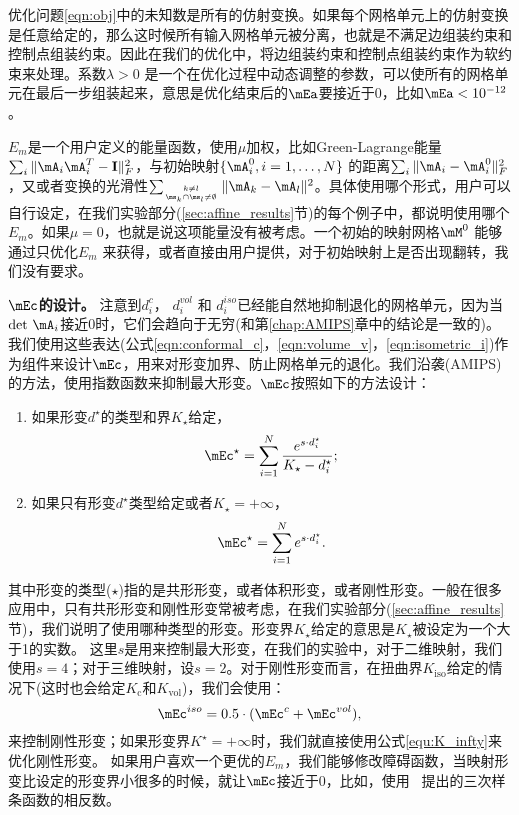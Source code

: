 优化问题\ref{eqn:obj}中的未知数是所有的仿射变换。如果每个网格单元上的仿射变换是任意给定的，那么这时候所有输入网格单元被分离，也就是不满足边组装约束和控制点组装约束。因此在我们的优化中，将边组装约束和控制点组装约束作为软约束来处理。系数$\lambda > 0$ 是一个在优化过程中动态调整的参数，可以使所有的网格单元在最后一步组装起来，意思是优化结束后的$\mEa$要接近于0，比如$\mEa<10^{-12}$。

$E_m$是一个用户定义的能量函数，使用$\mu$加权，比如Green-Lagrange能量$\sum_i \|\mA_i \mA_i^T - \mathbf{I}\|_F^2$，与初始映射$\{\mA_i^0,i=1,\ldots,N\}$ 的距离$\sum_i \|\mA_i - \mA_i^0\|_F^2$，又或者变换的光滑性$\sum_{k \neq l \atop \ms_k \cap \ms_l \neq \emptyset} \| \mA_k - \mA_l\|^2$。具体使用哪个形式，用户可以自行设定，在我们实验部分(\ref{sec:affine_results}节)的每个例子中，都说明使用哪个$E_m$。如果$\mu=0$，也就是说这项能量没有被考虑。一个初始的映射网格$\mM^0$ 能够通过只优化$E_m$ 来获得，或者直接由用户提供，对于初始映射上是否出现翻转，我们没有要求。

\textbf{$\mEc$的设计。} 注意到$d^c_i$， $d^{vol}_i$ 和 $d^{iso}_i$已经能自然地抑制退化的网格单元，因为当$\det \,\mA_i$接近0时，它们会趋向于无穷(和第\ref{chap:AMIPS}章中的结论是一致的)。我们使用这些表达(公式\ref{eqn:conformal_c}，\ref{eqn:volume_v}，\ref{eqn:isometric_i})作为组件来设计$\mEc$，用来对形变加界、防止网格单元的退化。我们沿袭\cite{Fu2015}(AMIPS)的方法，使用指数函数来抑制最大形变。$\mEc$按照如下的方法设计：\begin{enumerate}
  \item 如果形变$d^\star$的类型和界$K_\star$给定，
  \begin{equation}
  \mEc^{\star} = \sum_{i=1}^N  \frac{e^{s \cdot d^{\star}_i}}{K_{\star} - d^{\star}_i};
  \end{equation}
  \item 如果只有形变$d^\star$类型给定或者$K_\star = +\infty$，
   \begin{equation} \label{equ:K_infty}
  \mEc^{\star} = \sum_{i=1}^N e^{s \cdot d^\star_i}.
  \end{equation}
\end{enumerate}
其中形变的类型($\star$)指的是共形形变，或者体积形变，或者刚性形变。一般在很多应用中，只有共形形变和刚性形变常被考虑，在我们实验部分(\ref{sec:affine_results}节)，我们说明了使用哪种类型的形变。形变界$K_\star$给定的意思是$K_\star$被设定为一个大于1的实数。
这里$s$是用来控制最大形变，在我们的实验中，对于二维映射，我们使用$s = 4$；对于三维映射，设$s = 2$。对于刚性形变而言，在扭曲界$K_{\textrm{iso}}$给定的情况下(这时也会给定$K_{\textrm{c}}$和$K_{\textrm{vol}}$)，我们会使用：
\begin{equation} \label{equ:iso_bound}
 \mEc^{iso} = 0.5 \cdot (\mEc^{c} + \mEc^{vol}),
\end{equation}
来控制刚性形变；如果形变界$K^\star = +\infty$时，我们就直接使用公式\ref{equ:K_infty}来优化刚性形变。
如果用户喜欢一个更优的$E_m$，我们能够修改障碍函数，当映射形变比设定的形变界小很多的时候，就让$\mEc$接近于0，比如，使用~\cite{Schuller2013} 提出的三次样条函数的相反数。

